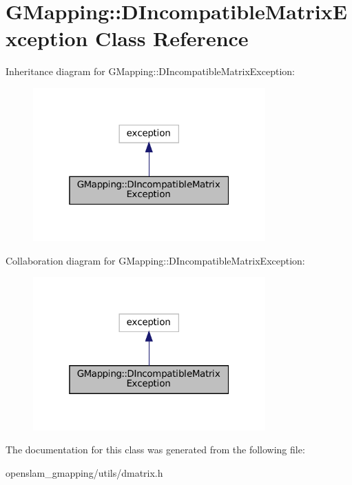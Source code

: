 \hypertarget{classGMapping_1_1DIncompatibleMatrixException}{}\section{G\+Mapping\+:\+:D\+Incompatible\+Matrix\+Exception Class Reference}
\label{classGMapping_1_1DIncompatibleMatrixException}


Inheritance diagram for G\+Mapping\+:\+:D\+Incompatible\+Matrix\+Exception\+:
\nopagebreak
\begin{figure}[H]
\begin{center}
\leavevmode
\includegraphics[width=253pt]{classGMapping_1_1DIncompatibleMatrixException__inherit__graph}
\end{center}
\end{figure}


Collaboration diagram for G\+Mapping\+:\+:D\+Incompatible\+Matrix\+Exception\+:
\nopagebreak
\begin{figure}[H]
\begin{center}
\leavevmode
\includegraphics[width=253pt]{classGMapping_1_1DIncompatibleMatrixException__coll__graph}
\end{center}
\end{figure}


The documentation for this class was generated from the following file\+:\begin{DoxyCompactItemize}
\item 
openslam\+\_\+gmapping/utils/dmatrix.\+h\end{DoxyCompactItemize}

